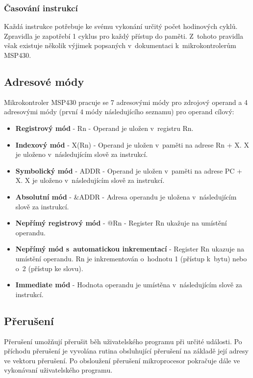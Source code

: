\subsubsection{Časování instrukcí}

Každá instrukce potřebuje ke svému vykonání určitý počet hodinových cyklů. Zpravidla je zapotřebí 1 cyklus pro každý přístup do paměti. Z~tohoto pravidla však existuje několik výjimek popsaných v~dokumentaci k~mikrokontrolerům MSP430.
 
\subsection{Adresové módy}

Mikrokontroler MSP430 pracuje se 7 adresovými módy pro zdrojový operand a 4 adresovými módy (první 4 módy následujícího seznamu) pro operand cílový:

\begin{itemize}
\item \textbf{Registrový mód} - Rn - Operand je uložen v~registru Rn.
\item \textbf{Indexový mód} - X(Rn) - Operand je uložen v~paměti na adrese Rn + X. X je uloženo v~následujícím slově za instrukcí.
\item \textbf{Symbolický mód} - ADDR - Operand je uložen v~paměti na adrese PC + X. X je uloženo v~následujícím slově za instrukcí.
\item \textbf{Absolutní mód} - \&ADDR - Adresa operandu je uložena v~následujícím slově za instrukcí.
\item \textbf{Nepřímý registrový mód} - @Rn - Register Rn ukažuje na umístění operandu.
\item \textbf{Nepřímý mód s~automatickou inkrementací} - Register Rn ukazuje na umístění operandu. Rn je inkrementován o~hodnotu 1 (přístup k~bytu) nebo o~2 (přístup ke slovu).
\item \textbf{Immediate mód} - Hodnota operandu je umístěna v~následujícím slově za instrukcí.
\end{itemize}

\subsection{Přerušení}

Přerušení umožňují přerušit běh uživatelského programu při určité události. Po příchodu přerušení je vyvolána rutina obsluhující přerušení na základě její adresy ve vektoru přerušení. Po obsloužení přerušení mikroprocesor pokračuje dále ve vykonávaní uživatelského programu.

